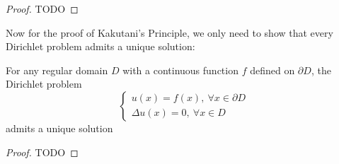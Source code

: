 \documentclass[10pt]{article}
\begin{document}
\begin{proof}
    {\color{red} TODO}
\end{proof}

Now for the proof of Kakutani's Principle, we only need to show that every Dirichlet problem admits a unique solution:

\begin{proposition}
    For any regular domain $D$ with a continuous function $f$ defined on $\partial D$, the Dirichlet problem
    \[
        \begin{cases}
            u(x) = f(x), \ \forall x \in \partial D \\
            \Delta u(x) = 0, \ \forall x \in D
        \end{cases}
    \]
    admits a unique solution
\end{proposition}

\begin{proof}
    {\color{red} TODO}
\end{proof}
\end{document}
